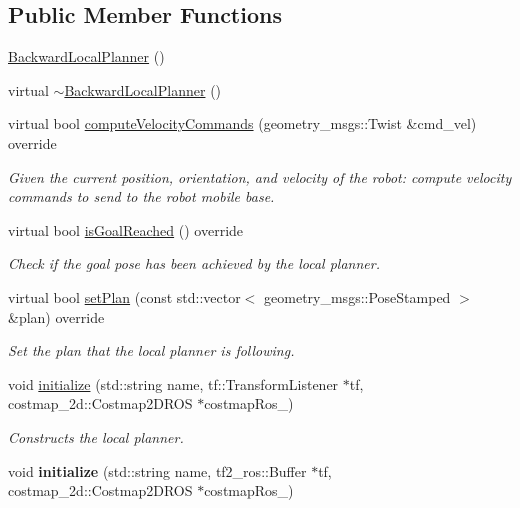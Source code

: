 \subsection*{Public Member Functions}
\begin{DoxyCompactItemize}
\item 
\hyperlink{classbackward__local__planner_1_1BackwardLocalPlanner_a54905830515c7e8ffeecdae050ce08d8}{Backward\-Local\-Planner} ()
\item 
virtual \hyperlink{classbackward__local__planner_1_1BackwardLocalPlanner_aab1430f79670f07bf21d0b796539f3e8}{$\sim$\-Backward\-Local\-Planner} ()
\item 
virtual bool \hyperlink{classbackward__local__planner_1_1BackwardLocalPlanner_ad7145b72592b48a21631befcdfbd14f0}{compute\-Velocity\-Commands} (geometry\-\_\-msgs\-::\-Twist \&cmd\-\_\-vel) override
\begin{DoxyCompactList}\small\item\em Given the current position, orientation, and velocity of the robot\-: compute velocity commands to send to the robot mobile base. \end{DoxyCompactList}\item 
virtual bool \hyperlink{classbackward__local__planner_1_1BackwardLocalPlanner_a63beb009f6c230d133ba34b16ce0b189}{is\-Goal\-Reached} () override
\begin{DoxyCompactList}\small\item\em Check if the goal pose has been achieved by the local planner. \end{DoxyCompactList}\item 
virtual bool \hyperlink{classbackward__local__planner_1_1BackwardLocalPlanner_ad2f7c554f1e107a58ac650d377646f27}{set\-Plan} (const std\-::vector$<$ geometry\-\_\-msgs\-::\-Pose\-Stamped $>$ \&plan) override
\begin{DoxyCompactList}\small\item\em Set the plan that the local planner is following. \end{DoxyCompactList}\item 
void \hyperlink{classbackward__local__planner_1_1BackwardLocalPlanner_a2892c597ff24b2b11993011f52df1570}{initialize} (std\-::string name, tf\-::\-Transform\-Listener $\ast$tf, costmap\-\_\-2d\-::\-Costmap2\-D\-R\-O\-S $\ast$costmap\-Ros\-\_\-)
\begin{DoxyCompactList}\small\item\em Constructs the local planner. \end{DoxyCompactList}\item 
\hypertarget{classbackward__local__planner_1_1BackwardLocalPlanner_a548a42d0016ef3a404783aca7169cae7}{void {\bfseries initialize} (std\-::string name, tf2\-\_\-ros\-::\-Buffer $\ast$tf, costmap\-\_\-2d\-::\-Costmap2\-D\-R\-O\-S $\ast$costmap\-Ros\-\_\-)}\label{classbackward__local__planner_1_1BackwardLocalPlanner_a548a42d0016ef3a404783aca7169cae7}


\end{DoxyCompactItemize}
